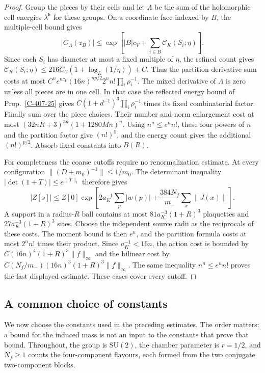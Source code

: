 \documentclass[11pt,letterpaper,reqno]{amsart}
\theoremstyle{definition}
\theoremstyle{remark}
\begin{document}
\begin{proof}
Group the pieces by their cells and let $\Lambda$ be
the sum of the holomorphic cell energies
$\lambda^{\mathfrak b}$ for these groups. On a
coordinate face indexed by $B$, the multiple-cell bound
gives
\[
 |G_\Lambda(z_B)|\le
 \exp\left[|B|c_V+\sum_{i\in B}
                      \mathscr C_K(S_i;\eta)\right].
\]
Since each $S_i$ has diameter at most a fixed multiple
of $\eta$, the refined count gives
$\mathscr C_K(S_i;\eta)\le
216C_{\mathscr C}(1+\log_L(1/\eta))+C$.
Thus the partition derivative sum costs at most
$C^ne^{nc_V}(16n)^{np/2}2^nn!\prod_i\rho_i^{-1}$.
The mixed derivative of $\Lambda$ is zero unless all
pieces are in one cell. In that case the reflected
energy bound of Prop.~\ref{C-407-25} gives
$C(1+d^{-1})^3\prod_i\rho_i^{-1}$ times its fixed
combinatorial factor.
Finally sum over the piece choices. Their number and
norm enlargement cost at most
$(32nR+3)^{3n}(1+1280Mn)^n$.
Using $n^n\le e^nn!$, these four powers of $n$ and
the partition factor give $(n!)^5$, and the energy
count gives the additional $(n!)^{p/2}$.
Absorb fixed constants into $B(R)$.

For completeness the coarse cutoffs require no
renormalization estimate. At every configuration
$\|(D+m_0)^{-1}\|\le1/m_0$. The determinant inequality
$|\det(1+T)|\le e^{\|T\|_1}$ therefore gives
\[
 |Z[s]|\le Z[0]\exp\left[
 2a_K^{-1}\sum_p|w(p)|+
 \frac{384N_f}{m_-}\sum_x\|J(x)\|\right].
\]
A support in a radius-$R$ ball contains at most
$81a_K^{-3}(1+R)^3$ plaquettes and
$27a_K^{-3}(1+R)^3$ sites. Choose the independent
source radii as the reciprocals of these costs.
The moment bound is then $e^n$, and the partition
formula costs at most $2^nn!$ times their product.
Since $a_K^{-1}<16n$, the action cost is bounded by
$C(16n)^4(1+R)^3\|f\|_\infty$ and the bilinear cost
by $C(N_f/m_-)(16n)^3(1+R)^3\|f\|_\infty$.
The same inequality $n^n\le e^nn!$ proves the last
displayed estimate. These cases cover every cutoff.
\end{proof}

\subsection{A common choice of constants}

We now choose the constants used in the preceding estimates.
The order matters: a bound for the induced mass is not an
input to the constants that prove that bound. Throughout,
the group is $\mathrm{SU}(2)$, the chamber parameter is $r=1/2$,
and $N_f\ge1$ counts the four-component flavours, each formed
from the two conjugate two-component blocks.
\end{document}
